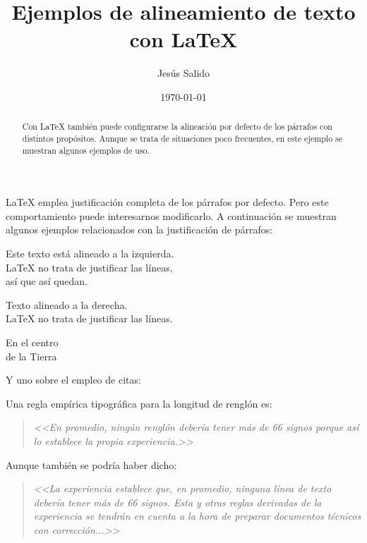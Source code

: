 \documentclass[11pt,a4paper]{article}
\title{Ejemplos de alineamiento de texto con \LaTeX}
\author{Jesús Salido}
\date{\today}
\begin{document}
\maketitle

\begin{abstract}
	Con \LaTeX{} también puede configurarse la alineación por defecto de los párrafos con distintos propósitos. Aunque se trata de situaciones poco frecuentes, en este ejemplo se muestran algunos ejemplos de uso.
\end{abstract}


\LaTeX{} emplea justificación completa de los párrafos por defecto. Pero este comportamiento puede interesarnos modificarlo. A continuación se muestran algunos ejemplos relacionados con la justificación de párrafos:

\begin{flushleft}
	Este texto está alineado a la izquierda. \\
	\LaTeX{} no trata de justificar las líneas, \\
	así que así quedan.
\end{flushleft}

\begin{flushright}
	Texto alineado a la derecha. \\
	\LaTeX{} no trata de justificar las líneas.
\end{flushright}

\begin{center}
	En el centro\\
	de la Tierra
\end{center}



\noindent Y uno sobre el empleo de citas:

Una regla empírica tipográfica para la longitud de renglón es:

\begin{quote}
\emph{	<<En promedio, ningún renglón debería tener más de 66 signos porque así lo establece la propia experiencia.>>}
\end{quote}


Aunque también se podría haber dicho:
\begin{quote}
\emph{	<<La experiencia establece que, en promedio, ninguna línea de texto debería tener más de 66 signos. Esta y otras reglas derivadas de la experiencia se tendrán en cuenta a la hora de preparar documentos técnicos con corrección...>>}
\end{quote}
\end{document}
